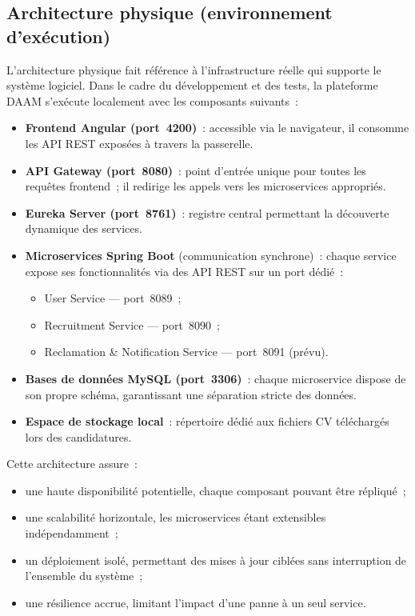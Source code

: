 \subsection{Architecture physique (environnement d'exécution)}

L'architecture physique fait référence à l'infrastructure réelle qui
supporte le système logiciel. Dans le cadre du développement et des
tests, la plateforme DAAM s'exécute localement avec les composants
suivants~:

\begin{itemize}
  \item \textbf{Frontend Angular (port~4200)}~: accessible via le navigateur,
        il consomme les API REST exposées à travers la passerelle.
  \item \textbf{API Gateway (port~8080)}~: point d'entrée unique pour
        toutes les requêtes frontend~; il redirige les appels vers les
        microservices appropriés.
  \item \textbf{Eureka Server (port~8761)}~: registre central permettant la
        découverte dynamique des services.
  \item \textbf{Microservices Spring Boot} (communication synchrone)~:
        chaque service expose ses fonctionnalités via des API REST sur un
        port dédié~:
        \begin{itemize}
          \item User Service --- port~8089~;
          \item Recruitment Service --- port~8090~;
          \item Reclamation \& Notification Service --- port~8091 (prévu).
        \end{itemize}
  \item \textbf{Bases de données MySQL (port~3306)}~: chaque microservice
        dispose de son propre schéma, garantissant une séparation stricte
        des données.
  \item \textbf{Espace de stockage local}~: répertoire dédié aux
        fichiers CV téléchargés lors des candidatures.
\end{itemize}

Cette architecture assure~:
\begin{itemize}
  \item une haute disponibilité potentielle, chaque composant pouvant
        être répliqué~;
  \item une scalabilité horizontale, les microservices étant extensibles
        indépendamment~;
  \item un déploiement isolé, permettant des mises à jour ciblées
        sans interruption de l'ensemble du système~;
  \item une résilience accrue, limitant l'impact d'une panne à un seul
        service.
\end{itemize}

